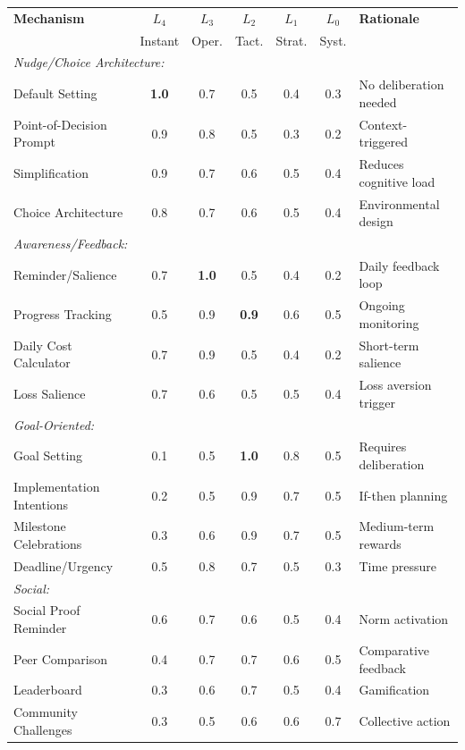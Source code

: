 \begin{tcolorbox}[colback=green!5!white, colframe=green!75!black,
    title=\textbf{EIT-EMP-3-D2-EXT: Full Scope-Mechanism Affinity Matrix}]
\begin{center}
\scriptsize
\begin{tabular}{l|ccccc|l}
\toprule
\textbf{Mechanism} & \textbf{$L_4$} & \textbf{$L_3$} & \textbf{$L_2$} & \textbf{$L_1$} & \textbf{$L_0$} & \textbf{Rationale} \\
 & Instant & Oper. & Tact. & Strat. & Syst. & \\
\midrule
\multicolumn{7}{l}{\textit{Nudge/Choice Architecture:}} \\
Default Setting & \textbf{1.0} & 0.7 & 0.5 & 0.4 & 0.3 & No deliberation needed \\
Point-of-Decision Prompt & 0.9 & 0.8 & 0.5 & 0.3 & 0.2 & Context-triggered \\
Simplification & 0.9 & 0.7 & 0.6 & 0.5 & 0.4 & Reduces cognitive load \\
Choice Architecture & 0.8 & 0.7 & 0.6 & 0.5 & 0.4 & Environmental design \\
\midrule
\multicolumn{7}{l}{\textit{Awareness/Feedback:}} \\
Reminder/Salience & 0.7 & \textbf{1.0} & 0.5 & 0.4 & 0.2 & Daily feedback loop \\
Progress Tracking & 0.5 & 0.9 & \textbf{0.9} & 0.6 & 0.5 & Ongoing monitoring \\
Daily Cost Calculator & 0.7 & 0.9 & 0.5 & 0.4 & 0.2 & Short-term salience \\
Loss Salience & 0.7 & 0.6 & 0.5 & 0.5 & 0.4 & Loss aversion trigger \\
\midrule
\multicolumn{7}{l}{\textit{Goal-Oriented:}} \\
Goal Setting & 0.1 & 0.5 & \textbf{1.0} & 0.8 & 0.5 & Requires deliberation \\
Implementation Intentions & 0.2 & 0.5 & 0.9 & 0.7 & 0.5 & If-then planning \\
Milestone Celebrations & 0.3 & 0.6 & 0.9 & 0.7 & 0.5 & Medium-term rewards \\
Deadline/Urgency & 0.5 & 0.8 & 0.7 & 0.5 & 0.3 & Time pressure \\
\midrule
\multicolumn{7}{l}{\textit{Social:}} \\
Social Proof Reminder & 0.6 & 0.7 & 0.6 & 0.5 & 0.4 & Norm activation \\
Peer Comparison & 0.4 & 0.7 & 0.7 & 0.6 & 0.5 & Comparative feedback \\
Leaderboard & 0.3 & 0.6 & 0.7 & 0.5 & 0.4 & Gamification \\
Community Challenges & 0.3 & 0.5 & 0.6 & 0.6 & 0.7 & Collective action \\

\end{tabular}
\end{center}
\end{tcolorbox}
